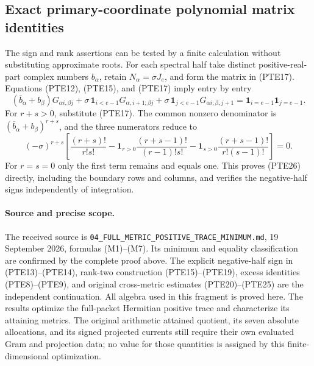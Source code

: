 \subsection{Exact primary-coordinate polynomial matrix identities}

The sign and rank assertions can be tested by a finite calculation
without substituting approximate roots.  For each spectral half take
distinct positive-real-part complex numbers \(b_\alpha\), retain
\(N_\alpha=\sigma J_e\), and form the matrix in (PTE17).  Equations
(PTE12), (PTE15), and (PTE17) imply entry by entry
\begin{equation}\tag{PTE26}\label{eq:pte26}
 (\overline b_\alpha+b_\beta)G_{\alpha i,\beta j}
 +\sigma\,\mathbf 1_{i<e-1}G_{\alpha,i+1;\beta j}
 +\sigma\,\mathbf 1_{j<e-1}G_{\alpha i;\beta,j+1}
 =\mathbf 1_{i=e-1}\mathbf 1_{j=e-1}.
\end{equation}
For \(r+s>0\), substitute (PTE17).  The common nonzero denominator
is \((\overline b_\alpha+b_\beta)^{r+s}\), and the three numerators
reduce to
\[
 (-\sigma)^{r+s}
 \left[\frac{(r+s)!}{r!s!}
 -\mathbf1_{r>0}\frac{(r+s-1)!}{(r-1)!s!}
 -\mathbf1_{s>0}\frac{(r+s-1)!}{r!(s-1)!}\right]=0.
\]
For \(r=s=0\) only the first term remains and equals one.
This proves (PTE26) directly, including the boundary rows and columns,
and verifies the negative-half signs independently of integration.

\paragraph{Source and precise scope.}
The received source is \texttt{04\_FULL\_METRIC\_POSITIVE\_TRACE\_MINIMUM.md},
19 September 2026, formulas (M1)--(M7).  Its minimum and equality
classification are confirmed by the complete proof above.  The explicit
negative-half sign in (PTE13)--(PTE14), rank-two construction
(PTE15)--(PTE19), excess identities (PTE8)--(PTE9), and original
cross-metric estimates (PTE20)--(PTE25) are the independent continuation.
All algebra used in this fragment is proved here.  The results optimize
the full-packet Hermitian positive trace and characterize its attaining
metrics.  The original arithmetic attained quotient, its seven absolute
allocations, and its signed projected currents still require their
own evaluated Gram and projection data; no value for those quantities
is assigned by this finite-dimensional optimization.
